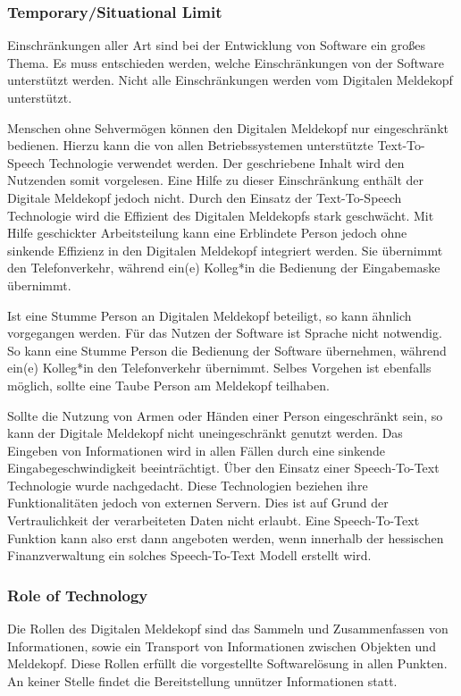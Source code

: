 \subsubsection{Temporary/Situational Limit}

Einschränkungen aller Art sind bei der Entwicklung von Software ein großes Thema.
Es muss entschieden werden, welche Einschränkungen von der Software unterstützt werden.
Nicht alle Einschränkungen werden vom Digitalen Meldekopf unterstützt.

Menschen ohne Sehvermögen können den Digitalen Meldekopf nur eingeschränkt bedienen.
Hierzu kann die von allen Betriebssystemen unterstützte Text-To-Speech Technologie verwendet werden.
Der geschriebene Inhalt wird den Nutzenden somit vorgelesen.
Eine Hilfe zu dieser Einschränkung enthält der Digitale Meldekopf jedoch nicht.
Durch den Einsatz der Text-To-Speech Technologie wird die Effizient des Digitalen Meldekopfs stark geschwächt.
Mit Hilfe geschickter Arbeitsteilung kann eine Erblindete Person jedoch ohne sinkende Effizienz in den Digitalen Meldekopf integriert werden.
Sie übernimmt den Telefonverkehr, während ein(e) Kolleg*in die Bedienung der Eingabemaske übernimmt.

Ist eine Stumme Person an Digitalen Meldekopf beteiligt, so kann ähnlich vorgegangen werden. 
Für das Nutzen der Software ist Sprache nicht notwendig.
So kann eine Stumme Person die Bedienung der Software übernehmen, während ein(e) Kolleg*in den Telefonverkehr übernimmt.
Selbes Vorgehen ist ebenfalls möglich, sollte eine Taube Person am Meldekopf teilhaben.

Sollte die Nutzung von Armen oder Händen einer Person eingeschränkt sein, so kann der Digitale Meldekopf nicht uneingeschränkt genutzt werden.
Das Eingeben von Informationen wird in allen Fällen durch eine sinkende Eingabegeschwindigkeit beeinträchtigt.
Über den Einsatz einer Speech-To-Text Technologie wurde nachgedacht.
Diese Technologien beziehen ihre Funktionalitäten jedoch von externen Servern.
Dies ist auf Grund der Vertraulichkeit der verarbeiteten Daten nicht erlaubt.
Eine Speech-To-Text Funktion kann also erst dann angeboten werden, wenn innerhalb der hessischen Finanzverwaltung ein solches Speech-To-Text Modell erstellt wird.

\subsubsection{Role of Technology}

Die Rollen des Digitalen Meldekopf sind das Sammeln und Zusammenfassen von Informationen, sowie ein Transport von Informationen zwischen Objekten und Meldekopf.
Diese Rollen erfüllt die vorgestellte Softwarelösung in allen Punkten.
An keiner Stelle findet die Bereitstellung unnützer Informationen statt.

